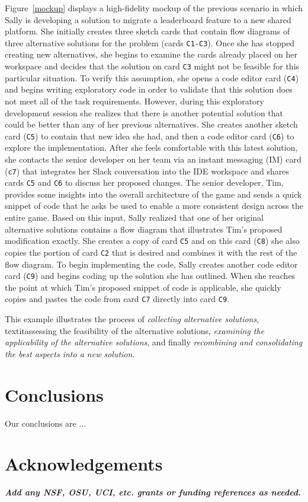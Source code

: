 \documentclass{ppig}
\newcommand{\bold}[1]{\textit{\textbf{\color{aoblue}#1}}}
\begin{document}
Figure~\ref{mockup} displays a high-fidelity mockup of the previous scenario in which Sally is developing a solution to migrate a leaderboard feature to a new shared platform.
She initially creates three sketch cards that contain flow diagrams of three alternative solutions for the problem (cards \texttt{C1-C3}).
Once she has stopped creating new alternatives, she begins to examine the cards already placed on her workspace and decides that the solution on card \texttt{C3} might not be feasible for this particular situation.
To verify this assumption, she opens a code editor card (\texttt{C4}) and begins writing exploratory code in order to validate that this solution does not meet all of the task requirements.
However, during this exploratory development session she realizes that there is another potential solution that could be better than any of her previous alternatives.
She creates another sketch card (\texttt{C5}) to contain that new idea she had, and then a code editor card (\texttt{C6}) to explore the implementation.
After she feels comfortable with this latest solution, she contacts the senior developer on her team via an instant messaging (IM) card (\texttt{c7}) that integrates her Slack conversation into the IDE workspace and shares cards \texttt{C5} and \texttt{C6} to discuss her proposed changes.
The senior developer, Tim, provides some insights into the overall architecture of the game and sends a quick snippet of code that he asks be used to enable a more consistent design across the entire game.
Based on this input, Sally realized that one of her original alternative solutions contains a flow diagram that illustrates Tim's proposed modification exactly.
She creates a copy of card \texttt{C5} and on this card (\texttt{C8}) she also copies the portion of card \texttt{C2} that is desired and combines it with the rest of the flow diagram.
To begin implementing the code, Sally creates another code editor card (\texttt{C9}) and begins coding up the solution she has outlined.
When she reaches the point at which Tim's proposed snippet of code is applicable, she quickly copies and pastes the code from card \texttt{C7} directly into card \texttt{C9}.

This example illustrates the process of \textit{collecting alternative solutions}, 
textit{assessing the feasibility of the alternative solutions}, \textit{examining the applicability of the alternative solutions}, and finally \textit{recombining and consolidating the best aspects into a new solution}.

\section{Conclusions}
Our conclusions are ...


\section{Acknowledgements}
\bold{Add any NSF, OSU, UCI, etc. grants or funding references as needed.}


 
\end{document}
